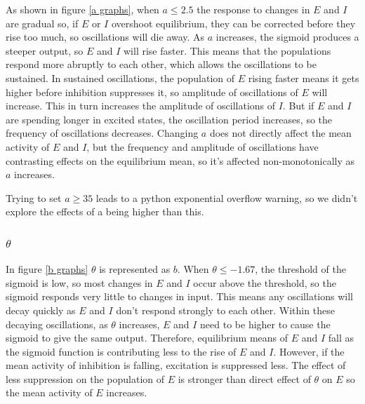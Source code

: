 \documentclass[10pt]{article}
\begin{document}
\begin{flushleft}
\begin{flushleft}
As shown in figure \ref{a graphs}, when $a \leq 2.5$  the response to changes in $E$ and $I$ are gradual so, if $E$ or $I$ overshoot equilibrium, they can be corrected before they rise too much, so oscillations will die away. As $a$ increases, the sigmoid produces a steeper output, so $E$ and $I$ will rise faster. This means that the populations respond more abruptly to each other, which allows the oscillations to be sustained. In sustained oscillations, the population of $E$ rising faster means it gets higher before inhibition suppresses it, so amplitude of oscillations of $E$ will increase. This in turn increases the amplitude of oscillations of $I$. But if $E$ and $I$ are spending longer in excited states, the oscillation period increases, so the frequency of oscillations decreases. Changing $a$ does not directly affect the mean activity of $E$ and $I$, but the frequency and amplitude of oscillations have contrasting effects on the equilibrium mean, so it's affected non-monotonically as $a$ increases.
\end{flushleft}

\begin{flushleft}
Trying to set $a \geq 35$ leads to a python exponential overflow warning, so we didn't explore the effects of a being higher than this.
\end{flushleft}
\subsubsection{$\theta$}

In figure \ref{b graphs} $\theta$ is represented as $b$. When $\theta \leq -1.67$, the threshold of the sigmoid is low, so most changes in $E$ and $I$ occur above the threshold, so the sigmoid responds very little to changes in input. This means any oscillations will decay quickly as $E$ and $I$ don't respond strongly to each other. Within these decaying oscillations, as $\theta$ increases, $E$ and $I$ need to be higher to cause the sigmoid to give the same output. Therefore, equilibrium means of $E$ and $I$ fall as the sigmoid function is contributing less to the rise of $E$ and $I$. However, if the mean activity of inhibition is falling, excitation is suppressed less. The effect of less suppression on the population of $E$ is stronger than direct effect of $\theta$ on $E$ so the mean activity of $E$ increases.
\newline


\end{flushleft}
\end{document}
